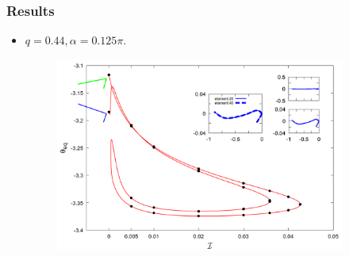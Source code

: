 \documentclass{beamer}
\begin{document}
\begin{frame}
	\frametitle{Results}
	\begin{overlayarea}{\textwidth}{\textheight}
	\begin{itemize}
		\item $q=0.44, \alpha=0.125\pi$.
		\begin{figure}[htb]
			\begin{center}
				\includegraphics[width=0.9\textwidth]{plots/combine_elastic_beam_I_theta_q_0.400_alpha_0.125pi_initial_-4.80_0.png}
			\end{center}
		\end{figure}
	\end{itemize}
	\end{overlayarea}
\end{frame}

\end{document}
